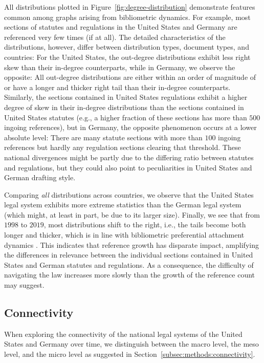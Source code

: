 \documentclass[utf8,sort&compress,table,hidelinks]{frontiersFPHY} %
\begin{document}
All distributions plotted in Figure~\ref{fig:degree-distribution} demonstrate features common among graphs arising from bibliometric dynamics. 
For example, most sections of statutes and regulations in the United States and Germany are referenced very few times (if at all). 
The detailed characteristics of the distributions, however, differ between distribution types, document types, and countries:
For the United States, the out-degree distributions exhibit less right skew than their in-degree counterparts, 
while in Germany, we observe the opposite: 
All out-degree distributions are either within an order of magnitude of or have a longer and thicker right tail than their in-degree counterparts. 
Similarly, the sections contained in United States regulations exhibit a higher degree of skew in their in-degree distributions than the sections contained in United States statutes 
(e.g., a higher fraction of these sections has more than $500$ ingoing references), 
but in Germany, the opposite phenomenon occurs at a lower absolute level: 
There are many statute sections with more than $100$ ingoing references but hardly any regulation sections clearing that threshold. 
These national divergences might be partly due to the differing ratio between statutes and regulations, but they could also point to peculiarities in United States and German drafting style.

Comparing \emph{all} distributions across countries, we observe that the United States legal system exhibits more extreme statistics than the German legal system (which might, at least in part, be due to its larger size).
Finally, we see that from $1998$ to $2019$, most distributions shift to the right, i.e., the tails become both longer and thicker, 
which is in line with bibliometric preferential attachment dynamics \cite{merton1968,price1976}.
This indicates that reference growth has disparate impact, amplifying the differences in relevance between the individual sections contained in United States and German statutes and regulations.
As a consequence, the difficulty of navigating the law increases more slowly than the growth of the reference count may suggest. 

\vspace*{12pt}
\subsection{Connectivity}
\label{subsec:results:connectivity}

When exploring the connectivity of the national legal systems of the United States and Germany over time, we distinguish between the macro level, the meso level, and the micro level as suggested in Section~\ref{subsec:methods:connectivity}.
\end{document}
